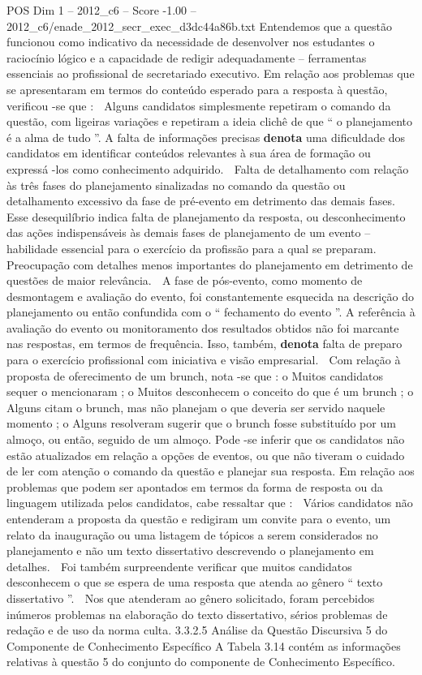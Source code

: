 \begin{textsample}{POS Dim 1 – 2012\_c6 – Score -1.00 – 2012\_c6/enade\_2012\_secr\_exec\_d3dc44a86b.txt}
Entendemos que a questão funcionou como indicativo da necessidade de desenvolver nos estudantes o raciocínio lógico e a capacidade de redigir adequadamente – ferramentas essenciais ao profissional de secretariado executivo.
Em relação aos problemas que se apresentaram em termos do conteúdo esperado para a resposta à questão, verificou -se que :  Alguns candidatos simplesmente repetiram o comando da questão, com ligeiras variações e repetiram a ideia clichê de que “ o planejamento é a alma de tudo ”.
A falta de informações precisas \textbf{denota} uma dificuldade dos candidatos em identificar conteúdos relevantes à sua área de formação ou expressá -los como conhecimento adquirido.  Falta de detalhamento com relação às três fases do planejamento sinalizadas no comando da questão ou detalhamento excessivo da fase de pré-evento em detrimento das demais fases.
Esse desequilíbrio indica falta de planejamento da resposta, ou desconhecimento das ações indispensáveis às demais fases de planejamento de um evento – habilidade essencial para o exercício da profissão para a qual se preparam.  Preocupação com detalhes menos importantes do planejamento em detrimento de questões de maior relevância.  A fase de pós-evento, como momento de desmontagem e avaliação do evento, foi constantemente esquecida na descrição do planejamento ou então confundida com o “ fechamento do evento ”.
A referência à avaliação do evento ou monitoramento dos resultados obtidos não foi marcante nas respostas, em termos de frequência.
Isso, também, \textbf{denota} falta de preparo para o exercício profissional com iniciativa e visão empresarial.  Com relação à proposta de oferecimento de um brunch, nota -se que : o Muitos candidatos sequer o mencionaram ; o Muitos desconhecem o conceito do que é um brunch ; o Alguns citam o brunch, mas não planejam o que deveria ser servido naquele momento ; o Alguns resolveram sugerir que o brunch fosse substituído por um almoço, ou então, seguido de um almoço.
Pode -se inferir que os candidatos não estão atualizados em relação a opções de eventos, ou que não tiveram o cuidado de ler com atenção o comando da questão e planejar sua resposta.
Em relação aos problemas que podem ser apontados em termos da forma de resposta ou da linguagem utilizada pelos candidatos, cabe ressaltar que :  Vários candidatos não entenderam a proposta da questão e redigiram um convite para o evento, um relato da inauguração ou uma listagem de tópicos a serem considerados no planejamento e não um texto dissertativo descrevendo o planejamento em detalhes.  Foi também surpreendente verificar que muitos candidatos desconhecem o que se espera de uma resposta que atenda ao gênero “ texto dissertativo ”.  Nos que atenderam ao gênero solicitado, foram percebidos inúmeros problemas na elaboração do texto dissertativo, sérios problemas de redação e de uso da norma culta. 3.3.2.5 Análise da Questão Discursiva 5 do Componente de Conhecimento Específico A Tabela 3.14 contém as informações relativas à questão 5 do conjunto do componente de Conhecimento Específico.

\end{textsample}
